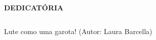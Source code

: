 \begin{center}
\textbf{DEDICATÓRIA}
\end{center}

$\!$\\


\vspace{10cm}
\vfill

\begin{flushright}
    Lute como uma garota!
\linebreak (Autor: Laura Barcella) 
\end{flushright}







